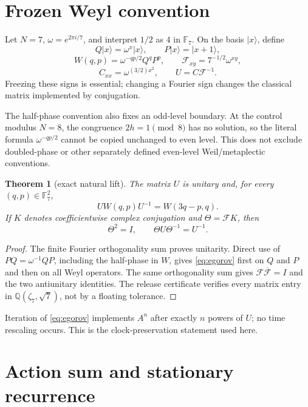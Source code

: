 \documentclass[11pt]{article}
\newtheorem{theorem}{Theorem}
\newcommand{\F}{\mathbb F}
\begin{document}
\section{Frozen Weyl convention}

Let $N=7$, $\omega=e^{2\pi i/7}$, and interpret $1/2$ as $4$ in $\F_7$.
On the basis $|x\rangle$, define
\[
 Q|x\rangle=\omega^x|x\rangle,\qquad
 P|x\rangle=|x+1\rangle,
\]
\[
 W(q,p)=\omega^{-qp/2}Q^qP^p,\qquad
 \mathcal F_{xy}=7^{-1/2}\omega^{xy},
\]
\[
 C_{xx}=\omega^{(3/2)x^2},\qquad U=C\mathcal F^{-1}.
\]
Freezing these signs is essential; changing a Fourier sign changes the
classical matrix implemented by conjugation.

The half-phase convention also fixes an odd-level boundary.  At the control
modulus $N=8$, the congruence $2h=1\pmod 8$ has no solution, so the literal
formula $\omega^{-qp/2}$ cannot be copied unchanged to even level.  This does
not exclude doubled-phase or other separately defined even-level
Weil/metaplectic conventions.

\begin{theorem}[exact natural lift]\label{thm:egorov}
The matrix $U$ is unitary and, for every $(q,p)\in\F_7^2$,
\begin{equation}\label{eq:egorov}
 U W(q,p)U^{-1}=W(3q-p,q).
\end{equation}
If $K$ denotes coefficientwise complex conjugation and
$\Theta=\mathcal F K$, then
\[
 \Theta^2=I,\qquad \Theta U\Theta^{-1}=U^{-1}.
\]
\end{theorem}

\begin{proof}
The finite Fourier orthogonality sum proves unitarity.  Direct use of
$PQ=\omega^{-1}QP$, including the half-phase in $W$, gives
\eqref{eq:egorov} first on $Q$ and $P$ and then on all Weyl operators.  The
same orthogonality sum gives $\mathcal F\overline{\mathcal F}=I$ and the two
antiunitary identities.  The release certificate verifies every matrix entry
in $\mathbb Q(\zeta_7,\sqrt7)$, not by a floating tolerance.
\end{proof}

Iteration of \eqref{eq:egorov} implements $A^n$ after exactly $n$ powers of
$U$; no time rescaling occurs.  This is the clock-preservation statement used
here.

\section{Action sum and stationary recurrence}
\end{document}
